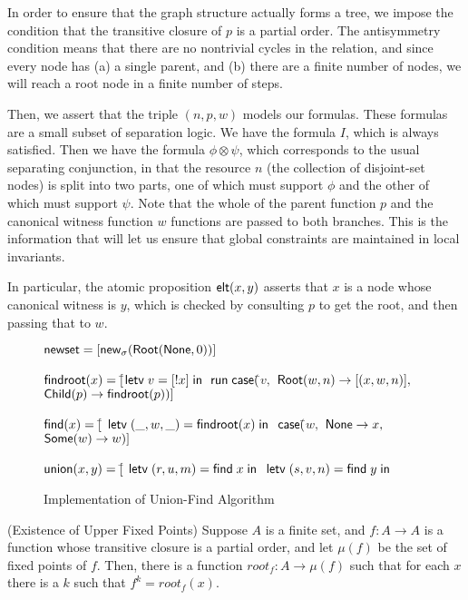 In order to ensure that the graph structure actually forms a tree, we
impose the condition that the transitive closure of $p$ is a partial
order. The antisymmetry condition means that there are no nontrivial
cycles in the relation, and since every node has (a) a single parent,
and (b) there are a finite number of nodes, we will reach a root node
in a finite number of steps.

Then, we assert that the triple $(n, p, w)$ models our formulas.
These formulas are a small subset of separation logic. We have the
formula $I$, which is always satisfied. Then we have the formula $\phi
\otimes \psi$, which corresponds to the usual separating conjunction,
in that the resource $n$ (the collection of disjoint-set nodes) is
split into two parts, one of which must support $\phi$ and the other
of which must support $\psi$. Note that the whole of the parent
function $p$ and the canonical witness function $w$ functions are
passed to both branches. This is the information that will let us
ensure that global constraints are maintained in local invariants.

In particular, the atomic proposition $\mathsf{elt}({x}, {y})$ asserts that $x$ is
a node whose canonical witness is $y$, which is checked by consulting
$p$ to get the root, and then passing that to $w$.

\begin{figure}
\mbox{}
\begin{specification}
\nextline $\mathsf{newset} = [\mathsf{new}_{\sigma}(\mathsf{Root}(\mathsf{None}, 0))]$

\nextline[1em] $\mathsf{findroot}(x) = [$\=$
                  \mathsf{letv}\;v = [!x]\;\mathsf{in}\;$ 
\nextline \>     $\mathsf{run}\;{}\mathsf{case}($\=$v,$ 
\nextline \> \>     $\mathsf{Root}(w, n) \to [(x, w, n)],$
\nextline \> \>     $\mathsf{Child}(p) \to \mathsf{findroot}(p))]$

\nextline[1em] $\mathsf{find}(x) = [$\=
             $\mathsf{letv}\;(\_, w, \_) = \mathsf{findroot}(x)\;\mathsf{in}\;$ 
\nextline \> $\mathsf{case}($\=$w,$ 
\nextline \> \> $\mathsf{None} \to x,$  
\nextline \> \> $\mathsf{Some}(w) \to w)]$

\nextline[1em] $\mathsf{union}(x, y) = [$\= 
                 $\mathsf{letv}\;(r, u, m) = \mathsf{find}\;x\;\mathsf{in}\;$ 
\nextline \>     $\mathsf{letv}\;(s, v, n) = \mathsf{find}\;y\;\mathsf{in}\;$ 
\nextline \>     
\end{specification}
\caption{Implementation of Union-Find Algorithm}
\label{union-find:impl}  
\end{figure}

\begin{lemma}{(Existence of Upper Fixed Points)}
Suppose $A$ is a finite set, and $f : A \to A$ is a function whose
transitive closure is a partial order, and let $\mu(f)$ be the
set of fixed points of $f$. Then, there is a function 
$\mathit{root}_f : A \to \mu(f)$ such that for each $x$ there is a 
$k$ such that $f^{k} = \mathit{root}_f(x)$.
\end{lemma}

